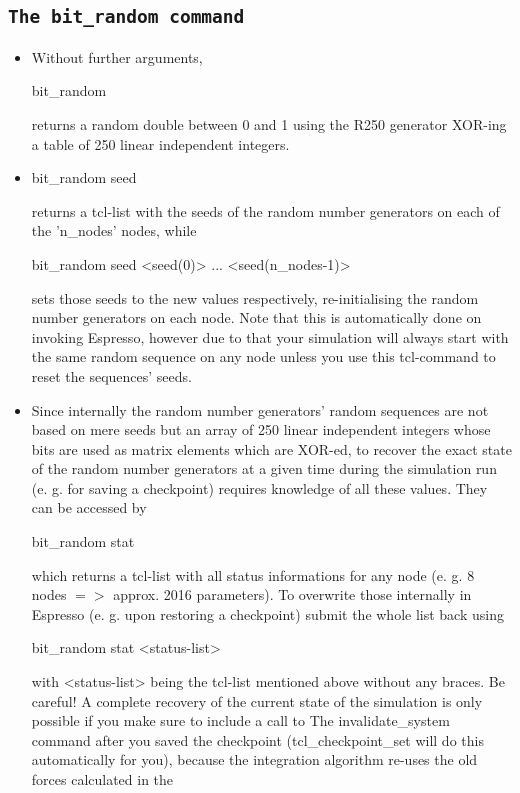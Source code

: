 \subsection{\texttt{The bit\_random command}}
\begin{itemize}
 \item
  Without further arguments,
\begin{code}
bit\_random
\end{code}
returns a random double between 0 and 1 using the R250 generator
XOR-ing a table of 250 linear independent integers.
 \item
\begin{code}
bit\_random seed
\end{code}
returns a tcl-list with the seeds of the random number generators on
each of the 'n\_nodes' nodes, while
\begin{code}
bit\_random seed <seed(0)> ... <seed(n\_nodes-1)>
\end{code}
sets those seeds to the new values respectively, re-initialising the
random number generators on each node.  Note that this is
automatically done on invoking Espresso, however due to that your
simulation will always start with the same random sequence on any node
unless you use this tcl-command to reset the sequences' seeds.
\item Since internally the random number generators' random sequences
  are not based on mere seeds but an array of 250 linear independent
  integers whose bits are used as matrix elements which are XOR-ed, to
  recover the exact state of the random number generators at a given
  time during the simulation run (e. g. for saving a checkpoint)
  requires knowledge of all these values. They can be accessed by
\begin{code}
bit\_random stat
\end{code}
which returns a tcl-list with all status informations for any node (e.
g. 8 nodes $=>$ approx. 2016 parameters). To overwrite those
internally in Espresso (e. g. upon restoring a checkpoint) submit the
whole list back using
\begin{code}
bit\_random stat <status-list>
\end{code}
with <status-list> being the tcl-list mentioned above without any
braces.  Be careful! A complete recovery of the current state of the
simulation is only possible if you make sure to include a call to The
invalidate\_system command after you saved the checkpoint
(tcl\_checkpoint\_set will do this automatically for you), because the
integration algorithm re-uses the old forces calculated in the

\end{itemize}
